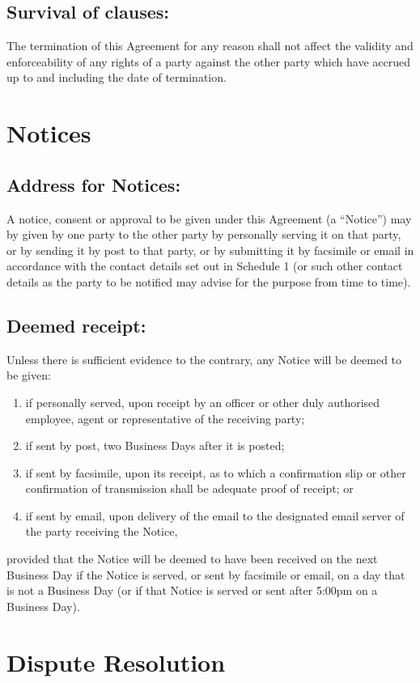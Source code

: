 \documentclass[a4paper,12pt]{article}
\begin{document}
\subsection{Survival of clauses:}  The termination of this Agreement for any reason shall not affect the validity and enforceability of any rights of a party against the other party which have accrued up to and including the date of termination.
\section{Notices}
\subsection{Address for Notices:}  A notice, consent or approval to be given under this Agreement (a “Notice”) may by given by one party to the other party by personally serving it on that party, or by sending it by post to that party, or by submitting it by facsimile or email in accordance with the contact details set out in Schedule 1 (or such other contact details as the party to be notified may advise for the purpose from time to time).
\subsection{Deemed receipt:} Unless there is sufficient evidence to the contrary, any Notice will be deemed to be given:
\begin{enumerate}
\item if personally served, upon receipt by an officer or other duly authorised employee, agent or representative of the receiving party; 
\item if sent by post, two Business Days after it is posted;
\item if sent by facsimile, upon its receipt, as to which a confirmation slip or other confirmation of transmission shall be adequate proof of receipt; or
\item if sent by email, upon delivery of the email to the designated email server of the party receiving the Notice,
\end{enumerate}
provided that the Notice will be deemed to have been received on the next Business Day if the Notice is served, or sent by facsimile or email, on a day that is not a Business Day (or if that Notice is served or sent after 5:00pm on a Business Day).

\section{Dispute Resolution}
\end{document}
